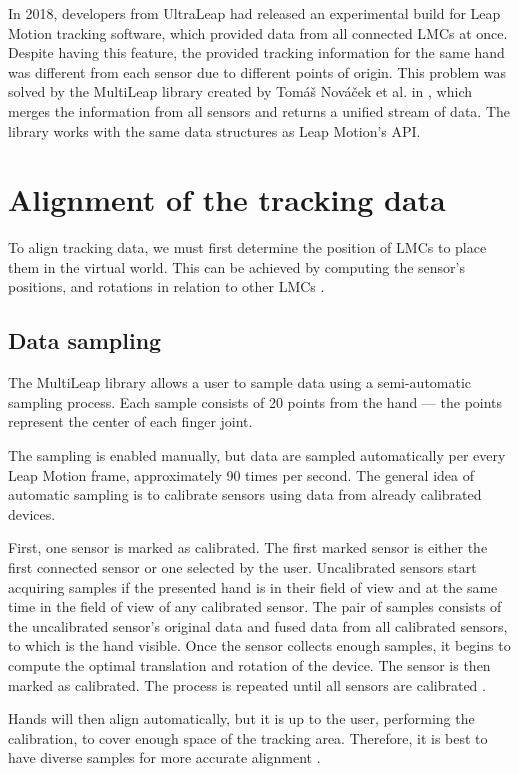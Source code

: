 
In 2018, developers from UltraLeap had released an experimental build for Leap Motion tracking software, which provided data from all connected LMCs at once. Despite having this feature, the provided tracking information for the same hand was different from each sensor due to different points of origin. This problem was solved by the MultiLeap library created by Tomáš Nováček et al. in \cite{tomasMultileap}, which merges the information from all sensors and returns a unified stream of data. The library works with the same data structures as Leap Motion's API.

\section{Alignment of the tracking data}

To align tracking data, we must first determine the position of LMCs to place them in the virtual world. This can be achieved by computing the sensor's positions, and rotations in relation to other LMCs \cite{tomasMultileap}.

\subsection{Data sampling}

The MultiLeap library allows a user to sample data using a semi-automatic sampling process. Each sample consists of 20 points from the hand –-- the points represent the center of each finger joint. 

The sampling is enabled manually, but data are sampled automatically per every Leap Motion frame, approximately 90 times per second. The general idea of automatic sampling is to calibrate sensors using data from already calibrated devices.

First, one sensor is marked as calibrated. The first marked sensor is either the first connected sensor or one selected by the user. Uncalibrated sensors start acquiring samples if the presented hand is in their field of view and at the same time in the field of view of any calibrated sensor. The pair of samples consists of the uncalibrated sensor's original data and fused data from all calibrated sensors, to which is the hand visible. Once the sensor collects enough samples, it begins to compute the optimal translation and rotation of the device. The sensor is then marked as calibrated. The process is repeated until all sensors are calibrated \cite{tomasMultileap}.


Hands will then align automatically, but it is up to the user, performing the calibration, to cover enough space of the tracking area. Therefore, it is best to have diverse samples for more accurate alignment \cite{tomasMultileap}.

